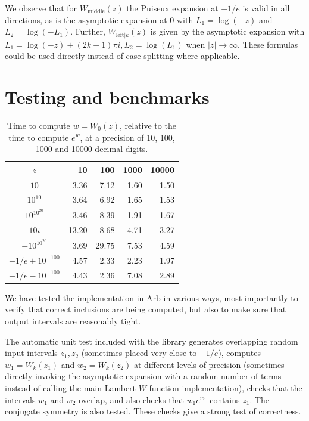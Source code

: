 \documentclass[11pt,a4paper]{article}
\begin{document}
We observe that for $W_{\mathrm{middle}}(z)$ the Puiseux expansion at $-1/e$ is valid
in all directions, as is the asymptotic expansion
at $0$ with $L_1 = \log(-z)$ and $L_2 = \log(-L_1)$.
Further, $W_{\mathrm{left}|k}(z)$ is given by the
asymptotic expansion with $L_1 = \log(-z) + (2k+1) \pi i, L_2 = \log(L_1)$ when $|z| \to \infty$.
These formulas could be used directly instead of
case splitting where applicable.

\section{Testing and benchmarks}

\begin{table}[h!]
\begin{centering}
\begin{tabular}{ c | r r r r }
$z$ & 10 & 100 & 1000 & 10000 \\ \hline
$10$ & 3.36 & 7.12 & 1.60 & 1.50 \\
$10^{10}$ & 3.64 & 6.92 & 1.65 & 1.53 \\
$10^{10^{20}}$ & 3.46 & 8.39 & 1.91 & 1.67 \\
$10i$ & 13.20 & 8.68 & 4.71 & 3.27 \\
$-10^{10^{20}}$ & 3.69 & 29.75 & 7.53 & 4.59 \\
$-1/e+10^{-100}$ & 4.57 & 2.33 & 2.23 & 1.97 \\
$-1/e-10^{-100}$ & 4.43 & 2.36 & 7.08 & 2.89
\end{tabular}
\caption{Time to compute $w = W_0(z)$, relative to the time
to compute $e^w$, at a precision of 10, 100, 1000 and 10000 decimal digits.}
\label{tab:timings}
\end{centering}
\end{table}

We have tested the implementation in Arb in various ways,
most importantly to verify that correct inclusions
are being computed, but also to make sure
that output intervals are reasonably tight.

The automatic unit test included with the library
generates overlapping random input intervals $z_1, z_2$ (sometimes placed very close to $-1/e$),
computes $w_1 = W_k(z_1)$ and $w_2 = W_k(z_2)$
at different levels of precision (sometimes directly invoking the
asymptotic expansion with a random number of terms instead of calling the main Lambert $W$ function implementation),
checks that the intervals $w_1$ and $w_2$ overlap,
and also checks that $w_1 e^{w_1}$ contains $z_1$.
The conjugate symmetry is also tested.
These checks give a strong test of correctness.
\end{document}
